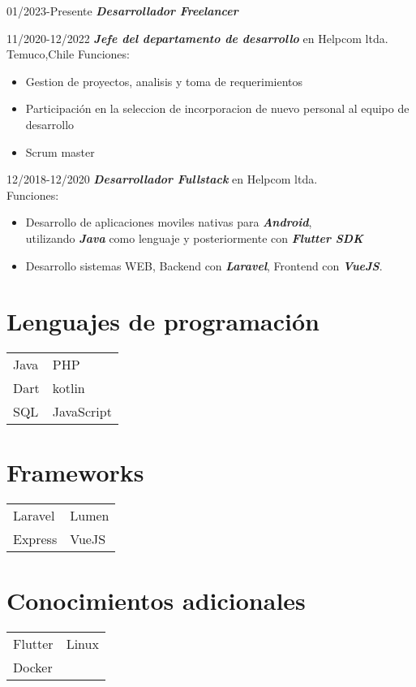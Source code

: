 \documentclass[a4,margin=1]{article}
\begin{document}
\begin{CV}

\item[01/2023-Presente]\emph{\textbf{Desarrollador Freelancer}}
\item[11/2020-12/2022]\emph{\textbf{Jefe del departamento de desarrollo}} en Helpcom ltda.
\\Temuco,Chile
Funciones: 
\begin{itemize}
  \item Gestion de proyectos, analisis y toma de requerimientos
  \item Participación en la seleccion de incorporacion de nuevo personal al equipo de desarrollo
  \item Scrum master
\end{itemize}
\item[12/2018-12/2020]\emph{\textbf{Desarrollador Fullstack}} en Helpcom ltda.\\
Funciones: 
\begin{itemize}
  \item Desarrollo de aplicaciones moviles nativas para \textbf{\emph{Android}},\\
  utilizando \textbf{\emph{Java}} como lenguaje y posteriormente con \textbf{\emph{Flutter SDK}}
  \item Desarrollo sistemas WEB, Backend con \textbf{\emph{Laravel}}, Frontend con \textbf{\emph{VueJS}}.
\end{itemize}

\end{CV}

\section{Lenguajes de programación}
\begin{table}[h] %
\begin{tabular}{l l}
  Java  & PHP  \\
  Dart & kotlin \\
  SQL & JavaScript \\
 
\end{tabular}
\end{table}

\section{Frameworks}
\begin{table}[h] %
\begin{tabular}{l l}
  Laravel  & Lumen \\
  Express  & VueJS \\
 
\end{tabular}
\end{table}

\section{Conocimientos adicionales}
\begin{table}[h] %
\begin{tabular}{l l}
  Flutter  & Linux \\
  Docker  &  \\
 
\end{tabular}
\end{table}
\end{document}
